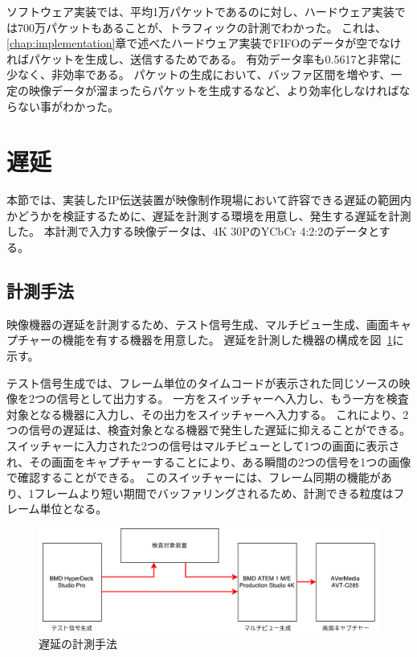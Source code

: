 ソフトウェア実装では、平均1万パケットであるのに対し、ハードウェア実装では700万パケットもあることが、トラフィックの計測でわかった。
これは、\ref{chap:implementation}章で述べたハードウェア実装でFIFOのデータが空でなければパケットを生成し、送信するためである。
有効データ率も0.5617と非常に少なく、非効率である。
パケットの生成において、バッファ区間を増やす、一定の映像データが溜まったらパケットを生成するなど、より効率化しなければならない事がわかった。

\section{遅延}

本節では、実装したIP伝送装置が映像制作現場において許容できる遅延の範囲内かどうかを検証するために、遅延を計測する環境を用意し、発生する遅延を計測した。
本計測で入力する映像データは、4K 30PのYCbCr 4:2:2のデータとする。

\subsection{計測手法}

映像機器の遅延を計測するため、テスト信号生成、マルチビュー生成、画面キャプチャーの機能を有する機器を用意した。
遅延を計測した機器の構成を図~\ref{fig:evaluate-diagram}に示す。

テスト信号生成では、フレーム単位のタイムコードが表示された同じソースの映像を2つの信号として出力する。
一方をスイッチャーへ入力し、もう一方を検査対象となる機器に入力し、その出力をスイッチャーへ入力する。
これにより、2つの信号の遅延は、検査対象となる機器で発生した遅延に抑えることができる。
スイッチャーに入力された2つの信号はマルチビューとして1つの画面に表示され、その画面をキャプチャーすることにより、ある瞬間の2つの信号を1つの画像で確認することができる。
このスイッチャーには、フレーム同期の機能があり、1フレームより短い期間でバッファリングされるため、計測できる粒度はフレーム単位となる。

\begin{figure}[htbp]
  \begin{center}
    \includegraphics[bb=0 0 697 212,width=15cm]{img/evaluate-diagram.pdf}
  \end{center}
  \caption{遅延の計測手法}
  \label{fig:evaluate-diagram}
\end{figure}

